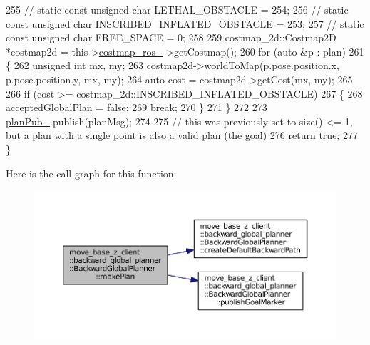 \begin{DoxyCode}
255     \textcolor{comment}{// static const unsigned char LETHAL\_OBSTACLE = 254;}
256     \textcolor{comment}{// static const unsigned char INSCRIBED\_INFLATED\_OBSTACLE = 253;}
257     \textcolor{comment}{// static const unsigned char FREE\_SPACE = 0;}
258 
259     costmap\_2d::Costmap2D *costmap2d = this->\hyperlink{classmove__base__z__client_1_1backward__global__planner_1_1BackwardGlobalPlanner_ae8c01babf5da5df079840246c34ef1ea}{costmap\_ros\_}->getCostmap();
260     \textcolor{keywordflow}{for} (\textcolor{keyword}{auto} &p : plan)
261     \{
262         \textcolor{keywordtype}{unsigned} \textcolor{keywordtype}{int} mx, my;
263         costmap2d->worldToMap(p.pose.position.x, p.pose.position.y, mx, my);
264         \textcolor{keyword}{auto} cost = costmap2d->getCost(mx, my);
265 
266         \textcolor{keywordflow}{if} (cost >= costmap\_2d::INSCRIBED\_INFLATED\_OBSTACLE)
267         \{
268             acceptedGlobalPlan = \textcolor{keyword}{false};
269             \textcolor{keywordflow}{break};
270         \}
271     \}
272     
273     \hyperlink{classmove__base__z__client_1_1backward__global__planner_1_1BackwardGlobalPlanner_ab074d9ac8ea790d7f5275ee27dae940c}{planPub\_}.publish(planMsg);
274 
275     \textcolor{comment}{// this was previously set to size() <= 1, but a plan with a single point is also a valid plan (the
       goal)}
276     \textcolor{keywordflow}{return} \textcolor{keyword}{true};
277 \}
\end{DoxyCode}


Here is the call graph for this function\+:
\nopagebreak
\begin{figure}[H]
\begin{center}
\leavevmode
\includegraphics[width=350pt]{classmove__base__z__client_1_1backward__global__planner_1_1BackwardGlobalPlanner_af9441c1bd8d258281458ca7fa012e0e6_cgraph}
\end{center}
\end{figure}




